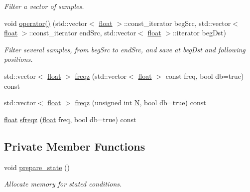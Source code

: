 \begin{DoxyCompactItemize}
\begin{DoxyCompactList}\small\item\em Filter a vector of samples. \end{DoxyCompactList}\item 
void \hyperlink{classupc_1_1DigitalFilter_a08b53e2a3884053f4a48d6860194cccb}{operator()} (std\+::vector$<$ \hyperlink{FFTReal__readme_8txt_a0ea2fae2a8106200bf378b90eae003cf}{float} $>$\+::const\+\_\+iterator beg\+Src, std\+::vector$<$ \hyperlink{FFTReal__readme_8txt_a0ea2fae2a8106200bf378b90eae003cf}{float} $>$\+::const\+\_\+iterator end\+Src, std\+::vector$<$ \hyperlink{FFTReal__readme_8txt_a0ea2fae2a8106200bf378b90eae003cf}{float} $>$\+::iterator beg\+Dst)
\begin{DoxyCompactList}\small\item\em Filter several samples, from beg\+Src to end\+Src, and save at beg\+Dst and following positions. \end{DoxyCompactList}\item 
std\+::vector$<$ \hyperlink{FFTReal__readme_8txt_a0ea2fae2a8106200bf378b90eae003cf}{float} $>$ \hyperlink{classupc_1_1DigitalFilter_a81e5fab2bf8cbab0e70622b7fa2cfe91}{freqz} (std\+::vector$<$ \hyperlink{FFTReal__readme_8txt_a0ea2fae2a8106200bf378b90eae003cf}{float} $>$ const freq, bool db=true) const 
\item 
std\+::vector$<$ \hyperlink{FFTReal__readme_8txt_a0ea2fae2a8106200bf378b90eae003cf}{float} $>$ \hyperlink{classupc_1_1DigitalFilter_a580b4f2584d0b993e1fc6f9d9256b9f8}{freqz} (unsigned int \hyperlink{FFTReal__readme_8txt_a049dd452c22185832440207517cffdaa}{N}, bool db=true) const 
\item 
\hyperlink{FFTReal__readme_8txt_a0ea2fae2a8106200bf378b90eae003cf}{float} \hyperlink{classupc_1_1DigitalFilter_a9589b9615fbd51754afb757c5431b1e0}{sfreqz} (\hyperlink{FFTReal__readme_8txt_a0ea2fae2a8106200bf378b90eae003cf}{float} freq, bool db=true) const 
\end{DoxyCompactItemize}
\subsection*{Private Member Functions}
\begin{DoxyCompactItemize}
\item 
void \hyperlink{classupc_1_1DigitalFilter_a66ebd4fb1a26af461c4845efbc528236}{prepare\+\_\+state} ()
\begin{DoxyCompactList}\small\item\em Allocate memory for stated conditions. \end{DoxyCompactList}\end{DoxyCompactItemize}
